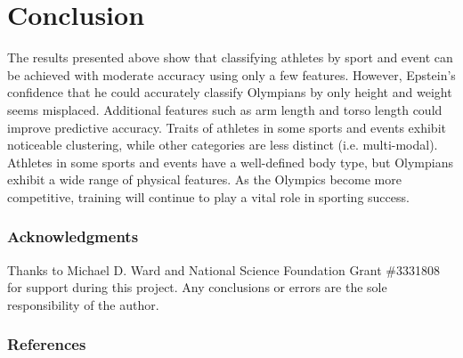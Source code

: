 \documentclass[12pt,letterpaper]{article} %
\begin{document}


\section{Conclusion}

The results presented above show that classifying athletes by sport and event can be achieved with moderate accuracy using only a few features. However, Epstein's confidence that he could accurately classify Olympians by only height and weight seems misplaced. Additional features such as arm length and torso length could improve predictive accuracy. Traits of athletes in some sports and events exhibit noticeable clustering, while other categories are less distinct (i.e. multi-modal). Athletes in some sports and events have a well-defined body type, but Olympians exhibit a wide range of physical features. As the Olympics become more competitive, training will continue to play a vital role in sporting success.


\subsubsection*{Acknowledgments}

Thanks to Michael D. Ward and National Science Foundation Grant \#3331808 for support during this project. Any conclusions or errors are the sole responsibility of the author.

\subsubsection*{References}



\begingroup
\renewcommand{\section}[2]{}


\endgroup
\end{document}
